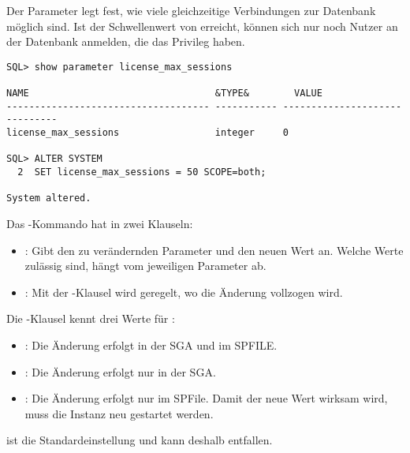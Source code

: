           \begin{merke}
            Der Parameter  legt fest, wie viele gleichzeitige Verbindungen zur Datenbank möglich sind. Ist der Schwellenwert von  erreicht, können sich nur noch Nutzer an der Datenbank anmelden, die das Privileg  haben.
          \end{merke}
          \begin{lstlisting}[caption={\parameter{license\_max\_sessions} wird geändert},label=admin15,language=oracle_sql,alsolanguage=sqlplus]
SQL> show parameter license_max_sessions

NAME                                 &TYPE&        VALUE
------------------------------------ ----------- ------------------------------
license_max_sessions                 integer     0

SQL> ALTER SYSTEM
  2  SET license_max_sessions = 50 SCOPE=both;

System altered.
          \end{lstlisting}
          Das -Kommando hat in  zwei Klauseln:
          \begin{itemize}
            \item {}: Gibt den zu verändernden Parameter und den neuen Wert an. Welche Werte zulässig sind, hängt vom jeweiligen Parameter ab.
            \item {}: Mit der -Klausel wird geregelt, wo die Änderung vollzogen wird.
          \end{itemize}
          Die -Klausel kennt drei Werte für :
          \begin{itemize}
            \item {}: Die Änderung erfolgt in der SGA und im SPFILE.
            \item {}: Die Änderung erfolgt nur in der SGA.
            \item {}: Die Änderung  erfolgt nur im SPFile. Damit der neue Wert wirksam wird, muss die Instanz neu gestartet werden.
          \end{itemize}
    
          \begin{merke}
             ist die Standardeinstellung und kann deshalb entfallen.
          \end{merke}

